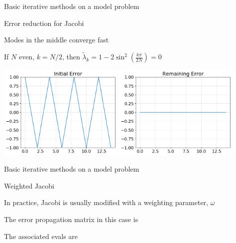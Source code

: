 \documentclass[18pt,xcolor=table]{beamer}
\begin{document}
\begin{frame}{Basic iterative methods on a model problem}
\begin{block}{Error reduction for Jacobi}
\bit
\item Modes in the middle converge fast
\item If $N$ even, $k = N/2$, then $\tilde\lambda_k = 1 - 2\sin^2\left(\frac{k\pi}{2N}\right) = 0$
\eit
\end{block}
\begin{center}
\includegraphics[width=0.45\textwidth]{../figures/jacobiInitialErrMiddleK}
\includegraphics[width=0.45\textwidth]{../figures/jacobiRemainingErrMiddleK}
\end{center}
\end{frame}

\begin{frame}{Basic iterative methods on a model problem}
\begin{block}{Weighted Jacobi}
\bit
\item In practice, Jacobi is usually modified with a weighting parameter, $\omega$
\item The error propagation matrix in this case is
\item The associated evals are
\eit
\end{block}
\end{frame}
\end{document}
